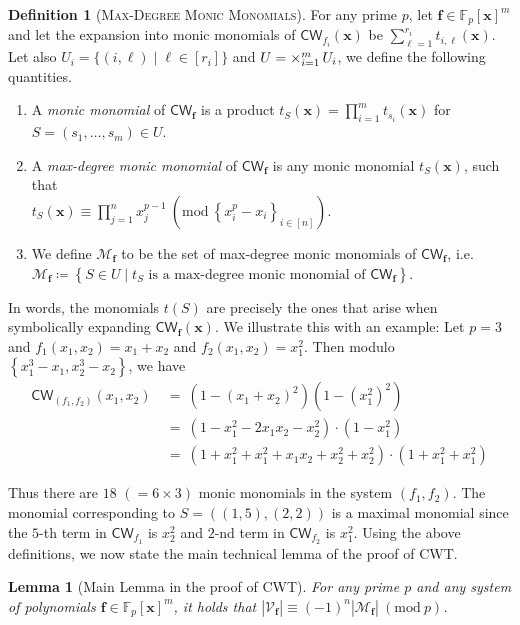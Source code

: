 \documentclass[10pt,a4paper]{article}
\newtheorem{lemma}[theorem]{Lemma}
\theoremstyle{definition}
\newtheorem{definition}[theorem]{Definition}
\theoremstyle{remark}
\newenvironment{Enumerate}{\begin{enumerate}}{\end{enumerate}}
\let\boldm\bm
\newcommand{\inparen}[1]{\left ( #1 \right )}
\renewcommand{\mod}[1]{~\inparen{\mathrm{mod}~#1}}
\newcommand{\bx}{{\boldm x}}
\def\abs#1{\left|#1\right|}
\def\set#1{\left\{#1\right\}}
\newcommand{\bbF}{\ensuremath{\mathbb{F}}}
\newcommand{\calM}{\mathcal{M}}
\newcommand{\calV}{\mathcal{V}}
\newcommand{\vecf}{\ensuremath{\boldsymbol{f}}}
\newcommand{\vecx}{\ensuremath{\boldsymbol{x}}}
\newcommand{\CWT}{CWT\xspace}
\newcommand{\CW}{\mathsf{CW}}
\providecommand{\bigtimes}{\mathop{\times}\displaylimits}
\begin{document}
\begin{definition}[\textsc{Max-Degree Monic Monomials}]
\label{def:max-degreeMonomial}
For any prime $p$, let $\vecf \in \bbF_p[\vecx]^m$ and let the expansion into monic monomials of $\CW_{f_i}(\vecx)$ be $\sum_{\ell = 1}^{r_i} t_{i, \ell}(\vecx)$. Let also $U_i = \{(i, \ell) \mid \ell \in [r_i]\}$ and $U = \bigtimes_{i = 1}^m U_i$, we define the following quantities.
  \begin{Enumerate}
    \item A \textit{monic monomial} of $\CW_{\vecf}$ is a product $t_S(\vecx) = \prod_{i = 1}^m t_{s_i}(\vecx)$ for $S = (s_1, \ldots, s_m) \in U$.
	    \item A \textit{max-degree monic monomial} of $\CW_{\vecf}$ is any monic monomial $t_S(\vecx)$, such that\\
    $t_S(\vecx) \equiv \prod_{j = 1}^n x_j^{p - 1} \mod{\set{x_i^p - x_i}_{i \in [n]}}$.
    \item We define $\calM_{\vecf}$ to be the set of max-degree monic monomials of $\CW_{\vecf}$, i.e. \\
	$\calM_{\vecf} \coloneqq \set{S \in U \mid t_S \text{ is a max-degree monic monomial of } \CW_{\vecf}}$.
  \end{Enumerate}
\end{definition}

\noindent In words, the monomials $t(S)$ are precisely the ones that arise when symbolically expanding $\CW_{\vecf}(\bx)$. We illustrate this with an example: Let $p = 3$ and $f_1(x_1, x_2) = x_1 + x_2$ and $f_2(x_1, x_2) = x_1^2$. Then modulo $\set{x_1^3 - x_1, x_2^3 - x_2}$, we have
\begin{align*}
\CW_{(f_1,f_2)}(x_1, x_2) &~=~ (1 - (x_1 + x_2)^2)(1 - (x_1^2)^2)\\
&~=~ (1 - x_1^2 - 2 x_1 x_2 - x_2^2) \cdot (1 - x_1^2)\\
&~=~ (1 + x_1^2 + x_1^2 + x_1x_2 +x_2^2 + x_2^2) \cdot (1 + x_1^2 + x_1^2)
\end{align*}

\noindent Thus there are $18$ $(= 6 \times 3)$ monic monomials in the system $(f_1, f_2)$. The monomial corresponding to $S = ((1,5),(2,2))$ is a maximal monomial since the $5$-th term in $\CW_{f_1}$ is $x_2^2$ and $2$-nd term in $\CW_{f_2}$ is $x_1^2$. Using the above definitions, we now state the main technical lemma of the proof of \CWT.

\begin{lemma}[Main Lemma in the proof of CWT] \label{lem:mainLemmaInProofOfCWT}
   For any prime $p$ and any system of polynomials
  $\vecf \in \bbF_p[\vecx]^m$, it holds that
  $\abs{\calV_{\vecf}} \equiv (-1)^n \abs{\calM_{\vecf}} \mod{p}$.
\end{lemma}
\end{document}
